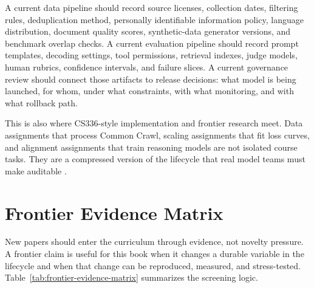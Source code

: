 A current data pipeline should record source licenses, collection dates, filtering rules, deduplication method, personally identifiable information policy, language distribution, document quality scores, synthetic-data generator versions, and benchmark overlap checks. A current evaluation pipeline should record prompt templates, decoding settings, tool permissions, retrieval indexes, judge models, human rubrics, confidence intervals, and failure slices. A current governance review should connect those artifacts to release decisions: what model is being launched, for whom, under what constraints, with what monitoring, and with what rollback path.

This is also where CS336-style implementation and frontier research meet. Data assignments that process Common Crawl, scaling assignments that fit loss curves, and alignment assignments that train reasoning models are not isolated course tasks. They are a compressed version of the lifecycle that real model teams must make auditable \cite{stanfordcs3362026}.

\section{Frontier Evidence Matrix}
\label{sec:frontier-evidence-matrix}

New papers should enter the curriculum through evidence, not novelty pressure. A frontier claim is useful for this book when it changes a durable variable in the lifecycle and when that change can be reproduced, measured, and stress-tested. Table~\ref{tab:frontier-evidence-matrix} summarizes the screening logic.

